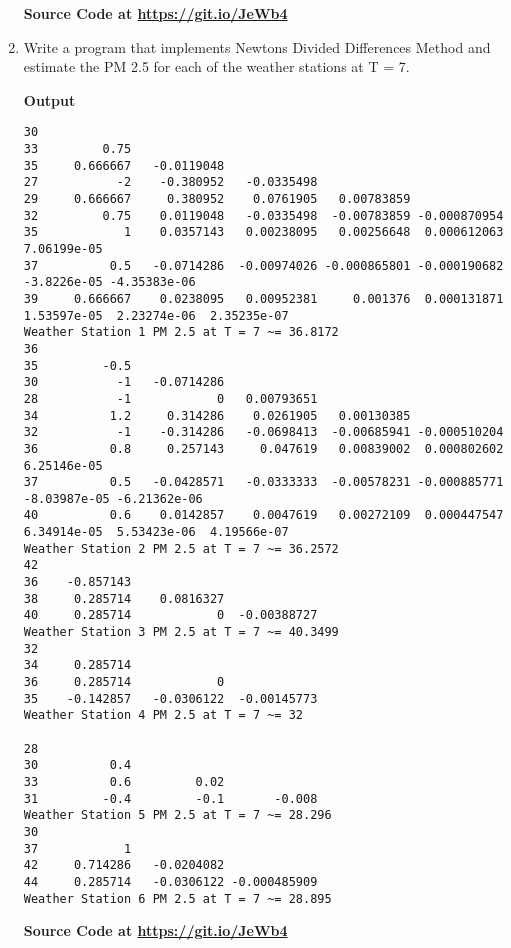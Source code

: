 \documentclass{exam}
\begin{document}
\begin{enumerate}
\begin{verbatim}
    \end{verbatim}
    \begin{center}
        \textbf{Source Code at \url{https://git.io/JeWb4}}
    \end{center}
	\item  Write  a  program  that  implements  Newtons  Divided  Differences  Method  and estimate the PM 2.5 for each of the weather stations at T = 7.
    \begin{center}
        \textbf{Output}
    \end{center}
    \begin{verbatim}
30
33         0.75
35     0.666667   -0.0119048
27           -2    -0.380952   -0.0335498
29     0.666667     0.380952    0.0761905   0.00783859
32         0.75    0.0119048   -0.0335498  -0.00783859 -0.000870954
35            1    0.0357143   0.00238095   0.00256648  0.000612063  7.06199e-05
37          0.5   -0.0714286  -0.00974026 -0.000865801 -0.000190682  -3.8226e-05 -4.35383e-06
39     0.666667    0.0238095   0.00952381     0.001376  0.000131871  1.53597e-05  2.23274e-06  2.35235e-07
Weather Station 1 PM 2.5 at T = 7 ~= 36.8172
36
35         -0.5
30           -1   -0.0714286
28           -1            0   0.00793651
34          1.2     0.314286    0.0261905   0.00130385
32           -1    -0.314286   -0.0698413  -0.00685941 -0.000510204
36          0.8     0.257143     0.047619   0.00839002  0.000802602  6.25146e-05
37          0.5   -0.0428571   -0.0333333  -0.00578231 -0.000885771 -8.03987e-05 -6.21362e-06
40          0.6    0.0142857    0.0047619   0.00272109  0.000447547  6.34914e-05  5.53423e-06  4.19566e-07
Weather Station 2 PM 2.5 at T = 7 ~= 36.2572
42
36    -0.857143
38     0.285714    0.0816327
40     0.285714            0  -0.00388727
Weather Station 3 PM 2.5 at T = 7 ~= 40.3499
32
34     0.285714
36     0.285714            0
35    -0.142857   -0.0306122  -0.00145773
Weather Station 4 PM 2.5 at T = 7 ~= 32

28
30          0.4
33          0.6         0.02
31         -0.4         -0.1       -0.008
Weather Station 5 PM 2.5 at T = 7 ~= 28.296
30
37            1
42     0.714286   -0.0204082
44     0.285714   -0.0306122 -0.000485909
Weather Station 6 PM 2.5 at T = 7 ~= 28.895

    \end{verbatim}
    \begin{center}
        \textbf{Source Code at \url{https://git.io/JeWb4}}
    \end{center}
\end{enumerate}
\end{document}
